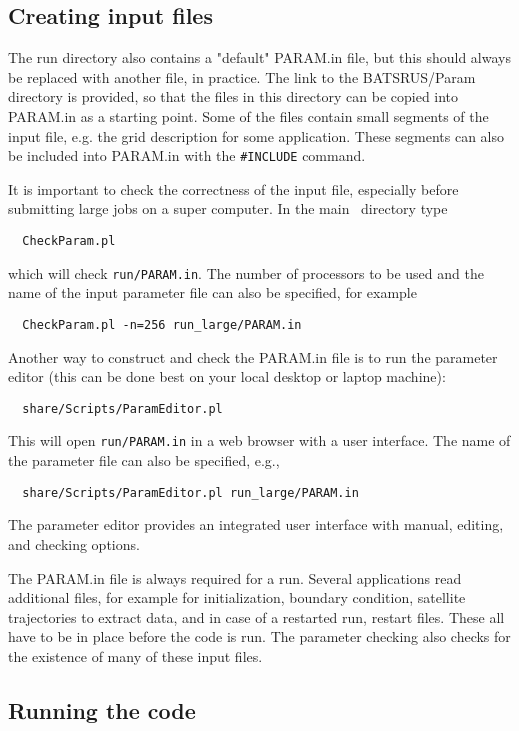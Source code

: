 \subsection{Creating input files}

The run directory also contains a "default" PARAM.in file, but this should always
be replaced with another file, in practice.
The link to the BATSRUS/Param directory is provided, so that the files in
this directory can be copied into PARAM.in as a starting point. 
Some of the files contain small segments of the input file, e.g. the grid
description for some application. These segments can also be included
into PARAM.in with the {\tt \#INCLUDE} command.

It is important to check the correctness of the input file, especially before submitting
large jobs on a super computer. In the main \BATSRUS\ directory type
\begin{verbatim}
  CheckParam.pl
\end{verbatim}
which will check {\tt run/PARAM.in}. The number of processors to be used and
the name of the input parameter file can also be specified, for example
\begin{verbatim}
  CheckParam.pl -n=256 run_large/PARAM.in
\end{verbatim}

Another way to construct and check the PARAM.in file is to run the parameter editor
(this can be done best on your local desktop or laptop machine):
\begin{verbatim}
  share/Scripts/ParamEditor.pl
\end{verbatim}
This will open {\tt run/PARAM.in} in a web browser with a user interface.
The name of the parameter file can also be specified, e.g., 
\begin{verbatim}
  share/Scripts/ParamEditor.pl run_large/PARAM.in
\end{verbatim}
The parameter editor provides an integrated user interface with manual, 
editing, and checking options.

The PARAM.in file is always required for a run. Several applications read additional files,
for example for initialization, boundary condition, satellite trajectories to extract data, 
and in case of a restarted run, restart files. These all have to be in place before
the code is run. The parameter checking also checks for the existence of many of these
input files.

\subsection{Running the code}

